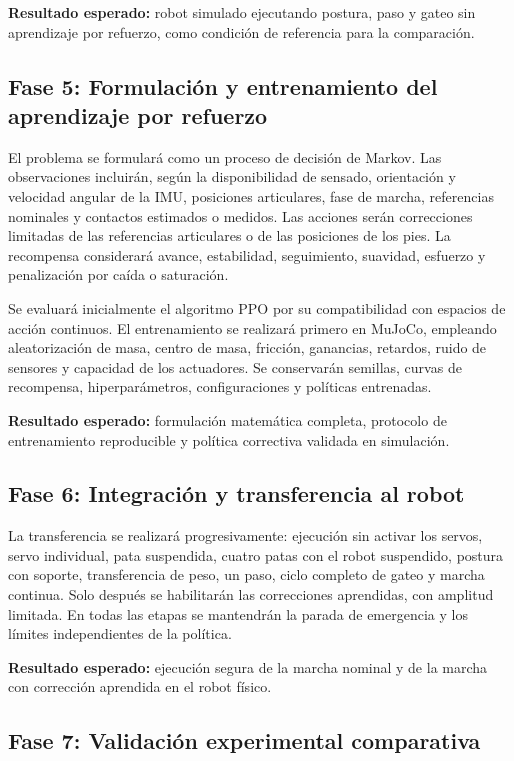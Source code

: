 \textbf{Resultado esperado:} robot simulado ejecutando postura, paso y gateo
sin aprendizaje por refuerzo, como condición de referencia para la comparación.

\subsection{Fase 5: Formulación y entrenamiento del aprendizaje por refuerzo}

El problema se formulará como un proceso de decisión de Markov. Las
observaciones incluirán, según la disponibilidad de sensado, orientación y
velocidad angular de la IMU, posiciones articulares, fase de marcha,
referencias nominales y contactos estimados o medidos. Las acciones serán
correcciones limitadas de las referencias articulares o de las posiciones de
los pies. La recompensa considerará avance, estabilidad, seguimiento,
suavidad, esfuerzo y penalización por caída o saturación.

Se evaluará inicialmente el algoritmo PPO por su compatibilidad con espacios de
acción continuos. El entrenamiento se realizará primero en MuJoCo, empleando
aleatorización de masa, centro de masa, fricción, ganancias, retardos, ruido de
sensores y capacidad de los actuadores. Se conservarán semillas, curvas de
recompensa, hiperparámetros, configuraciones y políticas entrenadas.

\textbf{Resultado esperado:} formulación matemática completa, protocolo de
entrenamiento reproducible y política correctiva validada en simulación.

\subsection{Fase 6: Integración y transferencia al robot}

La transferencia se realizará progresivamente: ejecución sin activar los
servos, servo individual, pata suspendida, cuatro patas con el robot suspendido,
postura con soporte, transferencia de peso, un paso, ciclo completo de gateo y
marcha continua. Solo después se habilitarán las correcciones aprendidas, con
amplitud limitada. En todas las etapas se mantendrán la parada de emergencia y
los límites independientes de la política.

\textbf{Resultado esperado:} ejecución segura de la marcha nominal y de la
marcha con corrección aprendida en el robot físico.

\subsection{Fase 7: Validación experimental comparativa}

